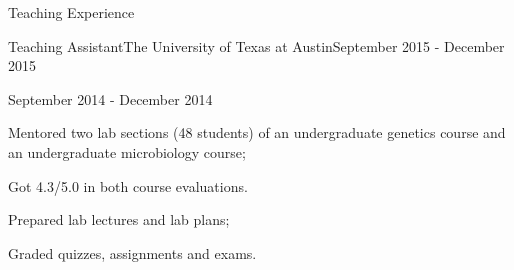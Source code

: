 \documentclass{my_resume} %
\begin{document}

\begin{rSection}{Teaching Experience}

\begin{rSubsection}{Teaching Assistant}{The University of Texas at
  Austin}{September 2015 - December 2015}
\begin{rSubsection}{}{}{September 2014 - December 2014}
\item Mentored two lab sections (48 students) of an undergraduate genetics
  course and an undergraduate microbiology course;
\item Got 4.3/5.0 in both course evaluations.
\item Prepared lab lectures and lab plans;
\item Graded quizzes, assignments and exams.
\end{rSubsection}
\end{rSubsection}
\end{rSection}
\end{document}
